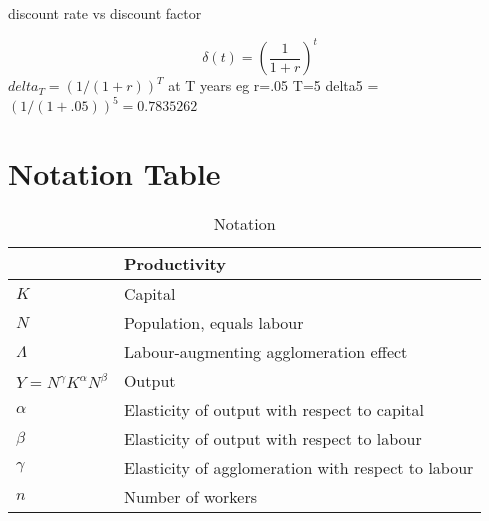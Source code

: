 discount rate vs discount factor

\[\delta(t)=\left(\frac{1}{1+r}\right)^t\]
    $delta_T=  (1/(1+r))^T$   at T years
    eg r=.05  T=5  delta5 =  $(1/(1+.05))^5 = 0.7835262$


\section{Notation Table}
\begin{longtable}{lp{10cm}}
\caption{Notation}                       \\

\hline           &  \textbf{Productivity} \\ \hline
$K$              &  Capital               \\ 
$N$              &  Population, equals labour \\ %
$\Lambda$    &  Labour-augmenting agglomeration effect \\
$Y=N^\gamma K^{\alpha }N^{\beta }$  &  Output \\ %
$\alpha$         &  Elasticity of output with respect to capital          \\
$\beta$          &  Elasticity of output with respect to labour           \\ %
$\gamma$         &  Elasticity of agglomeration with respect to labour    \\ %

$n$  &  Number of workers \\


\end{longtable}
